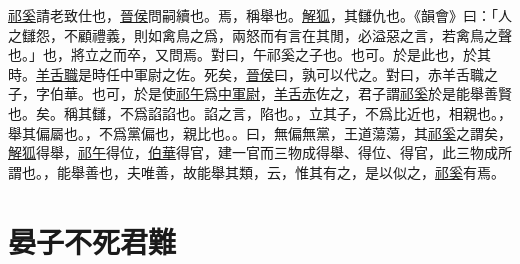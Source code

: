 \documentclass{article}
\newcommand{\tsu}{\small\kaishu\color{brown}}
\begin{document}
\uline{祁奚}請老{\tsu 致仕也}，\uline{晉侯}問嗣{\tsu 續也。}焉，稱{\tsu 舉也。}\uline{解狐}，其讎{\tsu 仇也。《韻會》曰：「人之讎怨，不顧禮義，則如禽鳥之爲，兩怒而有言在其閒，必溢惡之言，若禽鳥之聲也。」}也，將立之而卒，又問焉。對曰，午{\tsu 祁奚之子也。}也可。於是{\tsu 此也，於其時。}\uline{羊舌職}{\tsu 是時任中軍尉之佐。}死矣，\uline{晉侯}曰，孰可以代之。對曰，赤{\tsu 羊舌職之子，字伯華。}也可，於是使\uline{祁午}爲\uline{中軍尉}，\uline{羊舌赤}佐之，君子謂\uline{祁奚}於是能舉善{\tsu 賢也。}矣。稱其讎，不爲諂{\tsu 諂也。諂之言，陷也。}，立其子，不爲比{近也，相親也。}，舉其偏{\tsu 屬也。}，不爲黨{\tsu 偏也，親比也。}。曰，無偏無黨，王道蕩蕩，其\uline{祁奚}之謂矣，\uline{解狐}得舉，\uline{祁午}得位，\uline{伯華}得官，建一官而三物成{\tsu 得舉、得位、得官，此三物成所謂也。}，能舉善也，夫唯善，故能舉其類，云，惟其有之，是以似之，\uline{祁奚}有焉。

\section{晏子不死君難}

\noindent{\tsu 襄公二十五年}
\end{document}
